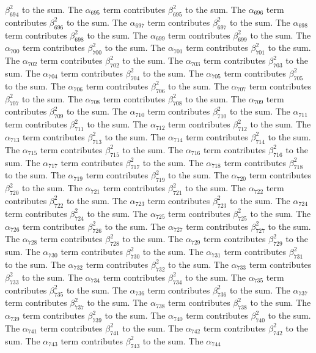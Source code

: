 \begin{lemma}
$\beta_{694}^{2}$ to the sum. The $\alpha_{695}$ term contributes $\beta_{695}^{2}$ to the sum. The $\alpha_{696}$ term contributes $\beta_{696}^{2}$ to the sum. The $\alpha_{697}$ term contributes $\beta_{697}^{2}$ to the sum. The $\alpha_{698}$ term contributes $\beta_{698}^{2}$ to the sum. The $\alpha_{699}$ term contributes $\beta_{699}^{2}$ to the sum. The $\alpha_{700}$ term contributes $\beta_{700}^{2}$ to the sum. The $\alpha_{701}$ term contributes $\beta_{701}^{2}$ to the sum. The $\alpha_{702}$ term contributes $\beta_{702}^{2}$ to the sum. The $\alpha_{703}$ term contributes $\beta_{703}^{2}$ to the sum. The $\alpha_{704}$ term contributes $\beta_{704}^{2}$ to the sum. The $\alpha_{705}$ term contributes $\beta_{705}^{2}$ to the sum. The $\alpha_{706}$ term contributes $\beta_{706}^{2}$ to the sum. The $\alpha_{707}$ term contributes $\beta_{707}^{2}$ to the sum. The $\alpha_{708}$ term contributes $\beta_{708}^{2}$ to the sum. The $\alpha_{709}$ term contributes $\beta_{709}^{2}$ to the sum. The $\alpha_{710}$ term contributes $\beta_{710}^{2}$ to the sum. The $\alpha_{711}$ term contributes $\beta_{711}^{2}$ to the sum. The $\alpha_{712}$ term contributes $\beta_{712}^{2}$ to the sum. The $\alpha_{713}$ term contributes $\beta_{713}^{2}$ to the sum. The $\alpha_{714}$ term contributes $\beta_{714}^{2}$ to the sum. The $\alpha_{715}$ term contributes $\beta_{715}^{2}$ to the sum. The $\alpha_{716}$ term contributes $\beta_{716}^{2}$ to the sum. The $\alpha_{717}$ term contributes $\beta_{717}^{2}$ to the sum. The $\alpha_{718}$ term contributes $\beta_{718}^{2}$ to the sum. The $\alpha_{719}$ term contributes $\beta_{719}^{2}$ to the sum. The $\alpha_{720}$ term contributes $\beta_{720}^{2}$ to the sum. The $\alpha_{721}$ term contributes $\beta_{721}^{2}$ to the sum. The $\alpha_{722}$ term contributes $\beta_{722}^{2}$ to the sum. The $\alpha_{723}$ term contributes $\beta_{723}^{2}$ to the sum. The $\alpha_{724}$ term contributes $\beta_{724}^{2}$ to the sum. The $\alpha_{725}$ term contributes $\beta_{725}^{2}$ to the sum. The $\alpha_{726}$ term contributes $\beta_{726}^{2}$ to the sum. The $\alpha_{727}$ term contributes $\beta_{727}^{2}$ to the sum. The $\alpha_{728}$ term contributes $\beta_{728}^{2}$ to the sum. The $\alpha_{729}$ term contributes $\beta_{729}^{2}$ to the sum. The $\alpha_{730}$ term contributes $\beta_{730}^{2}$ to the sum. The $\alpha_{731}$ term contributes $\beta_{731}^{2}$ to the sum. The $\alpha_{732}$ term contributes $\beta_{732}^{2}$ to the sum. The $\alpha_{733}$ term contributes $\beta_{733}^{2}$ to the sum. The $\alpha_{734}$ term contributes $\beta_{734}^{2}$ to the sum. The $\alpha_{735}$ term contributes $\beta_{735}^{2}$ to the sum. The $\alpha_{736}$ term contributes $\beta_{736}^{2}$ to the sum. The $\alpha_{737}$ term contributes $\beta_{737}^{2}$ to the sum. The $\alpha_{738}$ term contributes $\beta_{738}^{2}$ to the sum. The $\alpha_{739}$ term contributes $\beta_{739}^{2}$ to the sum. The $\alpha_{740}$ term contributes $\beta_{740}^{2}$ to the sum. The $\alpha_{741}$ term contributes $\beta_{741}^{2}$ to the sum. The $\alpha_{742}$ term contributes $\beta_{742}^{2}$ to the sum. The $\alpha_{743}$ term contributes $\beta_{743}^{2}$ to the sum. The $\alpha_{744}$ 
\end{lemma}
